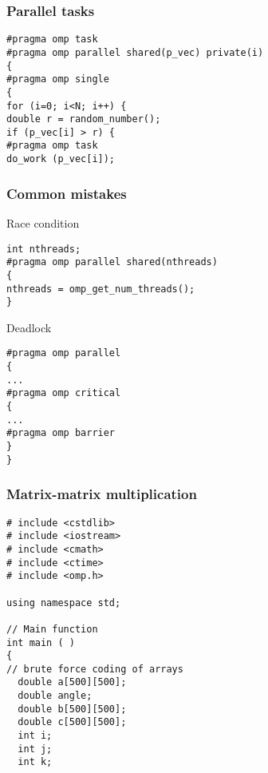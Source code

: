 \documentclass{beamer}
\begin{document}
\begin{frame}
\frametitle{Parallel tasks}

\begin{block}{}
\begin{verbatim}
#pragma omp task 
#pragma omp parallel shared(p_vec) private(i)
{
#pragma omp single
{
for (i=0; i<N; i++) {
double r = random_number();
if (p_vec[i] > r) {
#pragma omp task
do_work (p_vec[i]);
\end{verbatim}

\end{block}
\end{frame}

\begin{frame}
\frametitle{Common mistakes}

\begin{block}{}
Race condition
\begin{verbatim}
int nthreads;
#pragma omp parallel shared(nthreads)
{
nthreads = omp_get_num_threads();
}
\end{verbatim}
Deadlock
\begin{verbatim}
#pragma omp parallel
{
...
#pragma omp critical
{
...
#pragma omp barrier
}
}
\end{verbatim}


\end{block}
\end{frame}

\begin{frame}
\frametitle{Matrix-matrix multiplication}

\begin{block}{}
\begin{verbatim}
# include <cstdlib>
# include <iostream>
# include <cmath>
# include <ctime>
# include <omp.h>

using namespace std;

// Main function
int main ( )
{
// brute force coding of arrays
  double a[500][500];
  double angle;
  double b[500][500];
  double c[500][500];
  int i;
  int j;
  int k;
\end{verbatim}

\end{block}
\end{frame}
\end{document}
